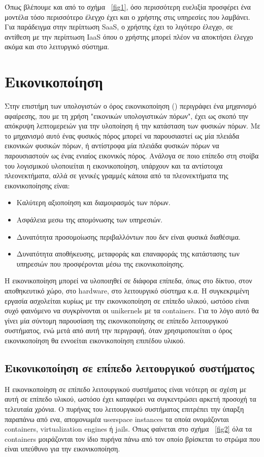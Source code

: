 \newpage
Όπως βλέπουμε και από το σχήμα ~\ref{fig1}, όσο περισσότερη ευελιξία προσφέρει
ένα μοντέλα τόσο περισσότερο έλεγχο έχει και ο χρήστης στις υπηρεσίες που
λαμβάνει. Για παράδειγμα στην περίπτωση SaaS, ο χρήστης έχει το λιγότερο έλεγχο,
σε αντίθεση με την περίπτωση IaaS όπου ο χρήστης μπορεί πλέον να αποκτήσει
έλεγχο ακόμα και στο λειτυργικό σύστημα.

\section{Εικονικοποίηση}

Στην επιστήμη των υπολογιστών ο όρος εικονικοποίηση () περιγράφει
ένα μηχανισμό αφαίρεσης, που με τη χρήση "εικονικών υπολογιστικών πόρων", έχει
ως σκοπό την απόκρυψη λεπτομερειών για την υλοποίηση ή την κατάσταση των φυσικών
πόρων. Με το μηχανισμό αυτό ένας φυσικός πόρος μπορεί να παρουσιαστεί ως μία
πλειάδα εικονικών φυσικών πόρων, ή αντίστροφα μία πλειάδα φυσικών πόρων να
παρουσιαστούν ως ένας ενιαίος εικονικός πόρος. Ανάλογα σε ποιο
επίπεδο στη στοίβα του λογισμικού υλοποιείται η εικονικοποίηση, υπάρχουν και τα
αντίστοιχα πλεονεκτήματα, αλλά σε γενικές γραμμές κάποια από τα  πλεονεκτήματα
της εικονικοποίησης είναι:

\begin{itemize}
	\item Καλύτερη αξιοποίηση και διαμοιρασμός των πόρων.
	\item Ασφάλεια μεσω της απομόνωσης των υπηρεσιών.
	\item Δυνατότητα προσομοίωσης περιβαλλόντων που δεν είναι φυσικά
		διαθέσιμα.
	\item Δυνατότητα αποθήκευσης, μεταφοράς και επαναφοράς της κατάστασης
		των υπηρεσιών που προσφέρονται μέσω της εικονικοποίησης.
\end{itemize}

Η εικονικοποίηση μπορεί να υλοποιηθεί σε διάφορα επίπεδα, όπως στο δίκτυο, στον
αποθηκευτικό χώρο, στο hardware, στο λειτουργικό σύστημα κ.α. Η συγκεκριμένη
εργασία ασχολείται κυρίως με την εικονικοποίηση σε επίπεδο υλικού, ωστόσο είναι
συχό φαινόμενο να συγκρίνονται οι unikernels με τα containers. Για το λόγο αυτό
θα γίνει μία σύντομη παρουσίαση της εικονικοποίησης σε επίπεδο λειτουργικού
συστήματος, ενώ μετά από αυτή την περιγραφή, όταν χρησιμοποιείται ο όρος
εικονικοποίηση θα εννοείται εικονικοποίηση επιπέδου υλικού. 

\subsection{Εικονικοποίηση σε επίπεδο λειτουργικού συστήματος}
Η εικονικοποίηση σε επίπεδο λειτουργικού συστήματος είναι νεότερη σε σχέση με
αυτή σε επίπεδο υλικού, ωστόσο έχει καταφέρει να συγκεντρώσει αρκετή προσοχή τα
τελευταία χρόνια. Ο πυρήνας του λειτουργικού συστήματος επιτρέπει την ύπαρξη
παραπάνω από ενα, απομονωμέα userspace instances τα οποία ονομάζονται
containers, virtualization engines ή jails. Όπως φαίνεται στο σχήμα
~\ref{fig2} όλα τα containers μοιράζονται τον
ίδιο πυρήνα πάνω από τον οποίο βρίσκεται το στρώμα που είναι υπεύθυνο για την εικονικοποίηση. 

